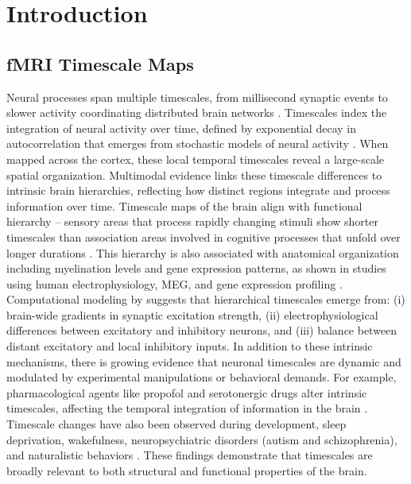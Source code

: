 \documentclass[docs/main.tex]{subfiles}
\begin{document}
\section{Introduction}

\subsection{fMRI Timescale Maps}
Neural processes span multiple timescales, from millisecond synaptic events to slower activity coordinating distributed brain networks \citep{buzsaki_large-scale_2004}. Timescales index the integration of neural activity over time, defined by exponential decay in autocorrelation that emerges from stochastic models of neural activity \citep[Supplementary Mathematical Note]{murray_hierarchy_2014}. When mapped across the cortex, these local temporal timescales reveal a large-scale spatial organization. Multimodal evidence links these timescale differences to intrinsic brain hierarchies, reflecting how distinct regions integrate and process information over time. Timescale maps of the brain align with functional hierarchy -- sensory areas that process rapidly changing stimuli show shorter timescales than association areas involved in cognitive processes that unfold over longer durations \citep{raut_hierarchical_2020, gao_neuronal_2020, hasson_hierarchy_2008, murray_hierarchy_2014, stephens_place_2013}. This hierarchy is also associated with anatomical organization including myelination levels and gene expression patterns, as shown in studies using human electrophysiology, MEG, and gene expression profiling \citep{gao_neuronal_2020, shafiei_neurophysiological_2023}.\\

Computational modeling by \citet{li_hierarchical_2022} suggests that hierarchical timescales emerge from: (i) brain-wide gradients in synaptic excitation strength, (ii) electrophysiological differences between excitatory and inhibitory neurons, and (iii) balance between distant excitatory and local inhibitory inputs. In addition to these intrinsic mechanisms, there is growing evidence that neuronal timescales are dynamic and modulated by experimental manipulations or behavioral demands. For example, pharmacological agents like propofol and serotonergic drugs alter intrinsic timescales, affecting the temporal integration of information in the brain \citep{huang_timescales_2018, shinn_functional_2023}. Timescale changes have also been observed during development, sleep deprivation, wakefulness, neuropsychiatric disorders (autism and schizophrenia), and naturalistic behaviors \citep{martin-burgos_development_2024, meisel_decline_2017, watanabe_atypical_2019, wengler_distinct_2020, manea_neural_2024}. These findings demonstrate that timescales are broadly relevant to both structural and functional properties of the brain.\\
\end{document}
